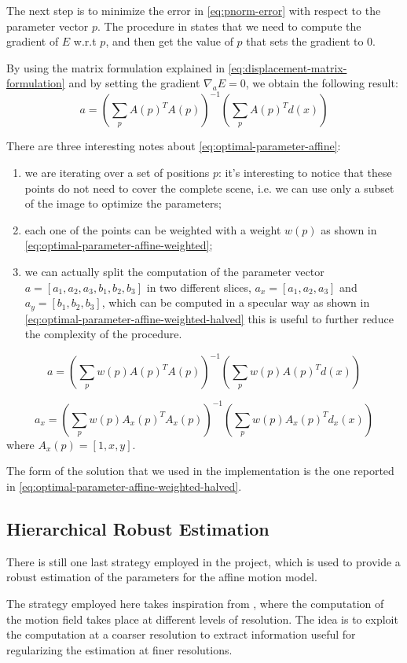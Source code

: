 The next step is to minimize the error in \cref{eq:pnorm-error} with respect to the parameter vector $p$.
The procedure in \cite{WangBook} states that we need to compute the gradient of $E$ w.r.t $p$, and then get the value of $p$ that sets the gradient to 0.

By using the matrix formulation explained in \cref{eq:displacement-matrix-formulation} and by setting the gradient $\nabla_a E = 0$, we obtain the following result:
\begin{equation}
    \label{eq:optimal-parameter-affine}
    a = \left (\sum_p A(p)^T A(p) \right )^{-1} \left (\sum_p A(p)^T d(x) \right)
\end{equation}

There are three interesting notes about \cref{eq:optimal-parameter-affine}:
\begin{enumerate}
    \item we are iterating over a set of positions $p$: it's interesting to notice that these points do not need to cover the complete scene, i.e. we can use only a subset of the image to optimize the parameters;
    \item each one of the points can be weighted with a weight $w(p)$ as shown in \cref{eq:optimal-parameter-affine-weighted};
    \item we can actually split the computation of the parameter vector $a = [a_1, a_2, a_3, b_1, b_2, b_3]$ in two different slices, $a_x = [a_1, a_2, a_3]$ and $a_y = [b_1, b_2, b_3]$, which can be computed in a specular way as shown in \cref{eq:optimal-parameter-affine-weighted-halved} this is useful to further reduce the complexity of the procedure.
\end{enumerate} 

\begin{equation}
    \label{eq:optimal-parameter-affine-weighted}
    a = \left (\sum_p w(p) A(p)^T A(p) \right )^{-1} \left (\sum_p w(p) A(p)^T d(x) \right)
\end{equation}

\begin{equation}
    \label{eq:optimal-parameter-affine-weighted-halved}
    a_x = \left (\sum_p w(p) A_x(p)^T A_x(p) \right )^{-1} \left (\sum_p w(p) A_x(p)^T d_x(x) \right)
\end{equation}
where $A_x(p) = [1,x,y]$.

The form of the solution that we used in the implementation is the one reported in \cref{eq:optimal-parameter-affine-weighted-halved}.

\subsection{Hierarchical Robust Estimation}
There is still one last strategy employed in the project, which is used to provide a robust estimation of the parameters for the affine motion model.

The strategy employed here takes inspiration from \cite{Dufeaux2000}, where the computation of the motion field takes place at different levels of resolution. The idea is to exploit the computation at a coarser resolution to extract information useful for regularizing the estimation at finer resolutions.
